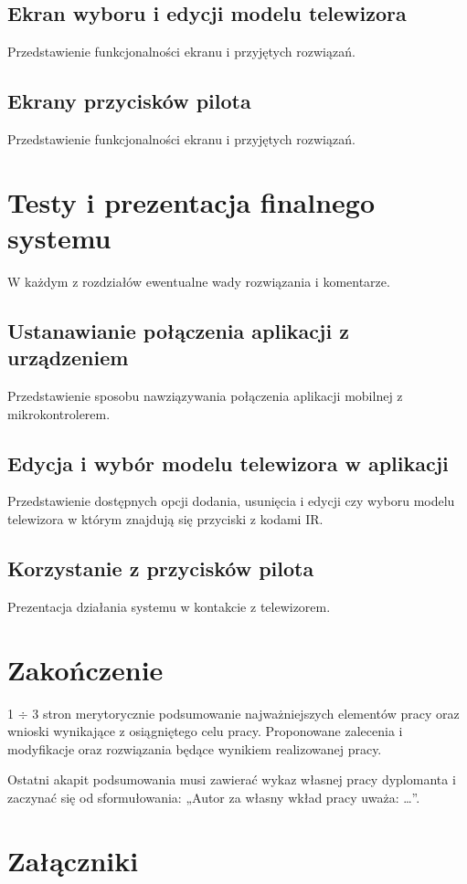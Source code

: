 \documentclass[12pt,twoside]{article}
\begin{document}
\subsection{Ekran wyboru i edycji modelu telewizora}
Przedstawienie funkcjonalności ekranu i przyjętych rozwiązań.
\subsection{Ekrany przycisków pilota}
Przedstawienie funkcjonalności ekranu i przyjętych rozwiązań.
\clearpage

\section{Testy i prezentacja finalnego systemu}
W każdym z rozdziałów ewentualne wady rozwiązania i komentarze.
\subsection{Ustanawianie połączenia aplikacji z urządzeniem}
Przedstawienie sposobu nawziązywania połączenia aplikacji mobilnej z mikrokontrolerem.
\subsection{Edycja i wybór modelu telewizora w aplikacji}
Przedstawienie dostępnych opcji dodania, usunięcia i edycji czy wyboru modelu telewizora w którym znajdują się przyciski z kodami IR.
\subsection{Korzystanie z przycisków pilota}
Prezentacja działania systemu w kontakcie z telewizorem.

\clearpage

\section{Zakończenie}

1 $\div$ 3 stron merytorycznie podsumowanie najważniejszych elementów pracy oraz wnioski wynikające z osiągniętego celu pracy. Proponowane zalecenia i modyfikacje oraz rozwiązania będące wynikiem realizowanej pracy.

Ostatni akapit podsumowania musi zawierać wykaz własnej pracy dyplomanta i zaczynać się od sformułowania: „Autor za własny wkład pracy uważa: \ldots”.

\clearpage

\section*{Załączniki}
\end{document}
